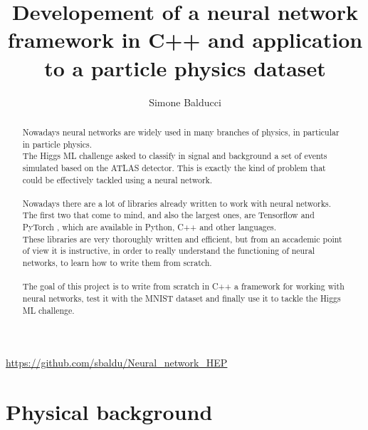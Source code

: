 \documentclass[12pt]{article}
\title{Developement of a neural network framework in C++ and application to a particle physics dataset}
\author{Simone Balducci}
\date{}
\begin{document}
\maketitle
\begin{center}
	\url{https://github.com/sbaldu/Neural_network_HEP}
\end{center}

\begin{abstract}
  \noindent Nowadays neural networks are widely used in many branches of physics, in par\-ti\-cu\-lar 
  in particle physics. \\
  The Higgs ML challenge \cite{HiggsML} asked to classify in signal and background a set of events simulated based on the 
  ATLAS detector. This is exactly the kind of problem that could be effectively tackled using a neural 
  network. \\ \\
  Nowadays there are a lot of libraries already written to work with neural networks. The first two that
  come to mind, and also the largest ones, are Tensorflow \cite{TensorFlow} and PyTorch \cite{Pytorch}, which are available in Python, C++ 
  and other languages. \\
  These libraries are very thoroughly written and efficient, but from an accademic point of view it is
  instructive, in order to really understand the functioning of neural networks, to learn how to write 
  them from scratch. \\ \\
  The goal of this project is to write from scratch in C++ a framework for wor\-king with neu\-ral networks, 
  test it with the MNIST \cite{MNIST} dataset and finally use it to tackle the Higgs ML challenge.
\end{abstract}
\pagebreak

\tableofcontents
\vspace{1cm}
\lstlistoflistings
\pagebreak

\section{Physical background}
\end{document}
